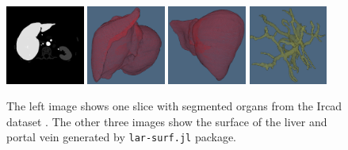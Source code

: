 \documentclass{article}
\begin{document}
\begin{figure}
\centering
\includegraphics[width=0.23\textwidth]{figs/ircad01_segmentation_65.png} 
\includegraphics[width=0.23\textwidth]{figs/liver_01_red_3.png} 
\includegraphics[width=0.23\textwidth]{figs/liver_01_red_4.png} 
\includegraphics[width=0.23\textwidth]{figs/portalvein_01_yellow_2.png} 
\caption{
The left image shows one slice 
with segmented organs from 
the Ircad dataset \cite{ircad}. The other three images show the surface of the liver and portal vein generated by \texttt{lar-surf.jl} package.
} \label{fig:liver}
\end{figure}
\end{document}
